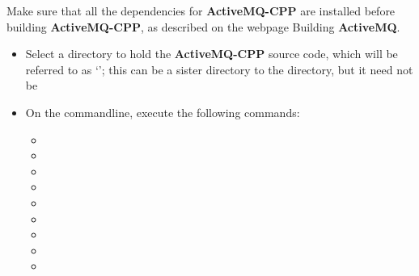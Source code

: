Make sure that all the dependencies for \textbf{ActiveMQ-CPP} are installed before
building \textbf{ActiveMQ-CPP}, as described on the web\longDash{}page
%
{Building \textbf{ActiveMQ}}.
\begin{itemize}
\item Select a directory to hold the \textbf{ActiveMQ-CPP} source code, which will be
referred to as `'; this can be a sister directory to the
 directory, but it need not be
\item\exSp{}On the command\longDash{}line, execute the following commands:
\begin{itemize}
\item {}
\item\exSp{}
\item\exSp{}
\item\exSp{}
\item\exSp{}
\item\exSp{}
\item\exSp{}
\item\exSp{}
\item\exSp{}
\end{itemize}
\end{itemize}
\tertiaryEnd
{}
